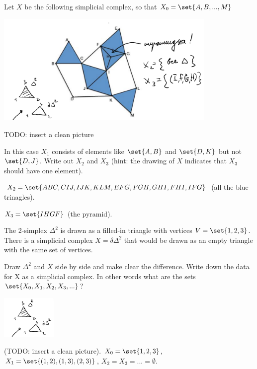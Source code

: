 \documentclass{article}
\begin{document}


Let $X$ be the following simplicial complex, so that $X_0 = \set{A, B, ... , M}$

\begin{center}
\includegraphics[width=0.8\textwidth]{img/simplicial_complex.png}
\end{center}

TODO: insert a clean picture

In this case $X_1$ consists of elements like $\set{A,B}$ and $\set{D,K}$ but not
$\set{D,J}$.  Write out $X_2$ and $X_3$ (hint: the drawing of $X$ indicates that
$X_3$ should have one element).

\ans

$X_2 = \set{ABC, CIJ, IJK, KLM, EFG, FGH, GHI, FHI, IFG}$ (all the blue
trinagles).

$X_3 = \set{IHGF}$ (the pyramid).


The 2-simplex $\Delta^2$ is drawn as a filled-in triangle with vertices $V =
\set{1, 2, 3}$. There is a simplicial complex $X = \delta \Delta^2$ that would
be drawn as an empty triangle with the same set of vertices.

\es Draw $\Delta^2$ and $X$ side by side and make clear the difference.
\ei Write down the data for X as a simplicial complex. In other words what are
    the sets $\set{X_0, X_1, X_2, X_3, ...}$?
\ee

\ans
\begin{center}
\includegraphics[width=0.2\textwidth]{img/simplicial_complex_example.png}
\end{center}
\es (TODO: insert a clean picture).
\ei $X_0 = \set{1,2,3}$, $X_1 = \set{(1,2), (1,3), (2,3)}$, $X_2 = X_3 = ... =
    \emptyset$.
\ee
\end{document}
